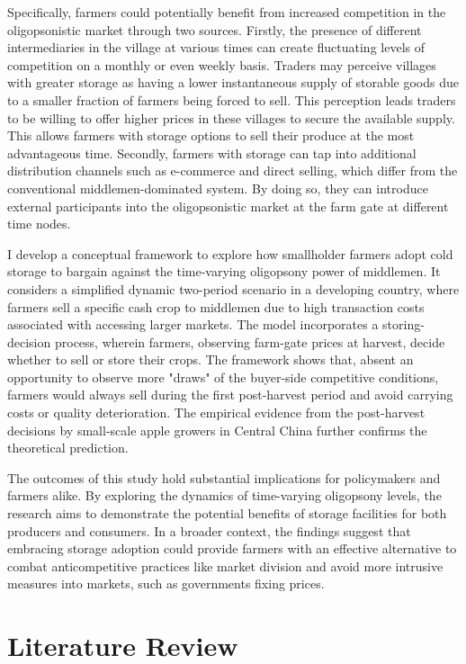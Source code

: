 \documentclass[12pt,authoryear, notitlepage]{elegantpaper}
\begin{document}
Specifically, farmers could potentially benefit from increased competition in the oligopsonistic market through two sources. Firstly, the presence of different intermediaries in the village at various times can create fluctuating levels of competition on a monthly or even weekly basis. Traders may perceive villages with greater storage as having a lower instantaneous supply of storable goods due to a smaller fraction of farmers being forced to sell. This perception leads traders to be willing to offer higher prices in these villages to secure the available supply. This allows farmers with storage options to sell their produce at the most advantageous time. Secondly, farmers with storage can tap into additional distribution channels such as e-commerce and direct selling, which differ from the conventional middlemen-dominated system. By doing so, they can introduce external participants into the oligopsonistic market at the farm gate at different time nodes. 

I develop a conceptual framework to explore how smallholder farmers adopt cold storage to bargain against the time-varying oligopsony power of middlemen. It considers a simplified dynamic two-period scenario in a developing country, where farmers sell a specific cash crop to middlemen due to high transaction costs associated with accessing larger markets. The model incorporates a storing-decision process, wherein farmers, observing farm-gate prices at harvest, decide whether to sell or store their crops. The framework shows that, absent an opportunity to observe more "draws" of the buyer-side competitive conditions, farmers would always sell during the first post-harvest period and avoid carrying costs or quality deterioration. The empirical evidence from the post-harvest decisions by small-scale apple growers in Central China further confirms the theoretical prediction. 

The outcomes of this study hold substantial implications for policymakers and farmers alike. By exploring the dynamics of time-varying oligopsony levels, the research aims to demonstrate the potential benefits of storage facilities for both producers and consumers. In a broader context, the findings suggest that embracing storage adoption could provide farmers with an effective alternative to combat anticompetitive practices like market division and avoid more intrusive measures into markets, such as governments fixing prices.

\section{Literature Review}
    
\end{document}
